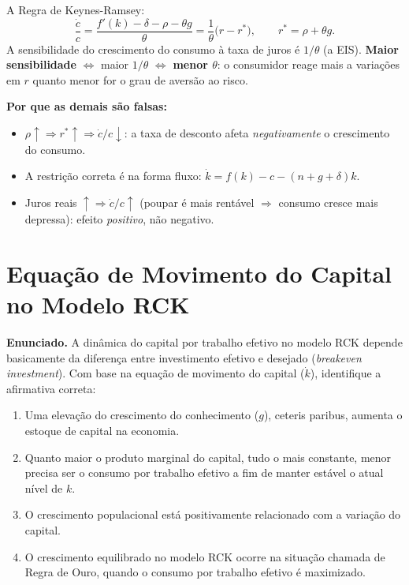 \documentclass[12pt, a4paper]{article}
\begin{document}
\begin{correctbox}[title={Resposta correta: a)}]
A Regra de Keynes-Ramsey:
\[
\frac{\dot{c}}{c} = \frac{f'(k) - \delta - \rho - \theta g}{\theta}
  = \frac{1}{\theta}\bigl(r - r^*\bigr),
  \qquad r^* = \rho + \theta g.
\]
A sensibilidade do crescimento do consumo à taxa de juros é $1/\theta$ (a EIS).
\textbf{Maior sensibilidade} $\Leftrightarrow$ maior $1/\theta$ $\Leftrightarrow$ \textbf{menor $\theta$}:
o consumidor reage mais a variações em $r$ quanto menor for o grau de aversão ao risco. \checkmark

\textbf{Por que as demais são falsas:}
\begin{itemize}[leftmargin=*]
\item[b)] $\rho\uparrow \Rightarrow r^*\uparrow \Rightarrow \dot{c}/c\downarrow$: a taxa de desconto afeta
\emph{negativamente} o crescimento do consumo.
\item[c)] A restrição correta é na forma fluxo: $\dot{k} = f(k) - c - (n+g+\delta)k$.
\item[d)] Juros reais $\uparrow \Rightarrow \dot{c}/c\uparrow$ (poupar é mais rentável $\Rightarrow$ consumo
cresce mais depressa): efeito \emph{positivo}, não negativo.
\end{itemize}
\end{correctbox}

\section{Equação de Movimento do Capital no Modelo RCK}

\textbf{Enunciado.} A dinâmica do capital por trabalho efetivo no modelo RCK depende basicamente da diferença entre investimento efetivo e desejado (\textit{breakeven investment}). Com base na equação de movimento do capital ($\dot{k}$), identifique a afirmativa correta:

\begin{enumerate}[label=\alph*)]
\item Uma elevação do crescimento do conhecimento ($g$), ceteris paribus, aumenta o estoque de capital na economia.
\item Quanto maior o produto marginal do capital, tudo o mais constante, menor precisa ser o consumo por trabalho efetivo a fim de manter estável o atual nível de $k$.
\item O crescimento populacional está positivamente relacionado com a variação do capital.
\item O crescimento equilibrado no modelo RCK ocorre na situação chamada de Regra de Ouro, quando o consumo por trabalho efetivo é maximizado.
\end{enumerate}
\end{document}
